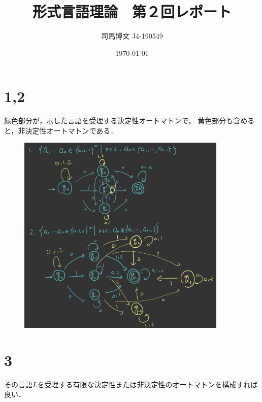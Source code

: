 \documentclass[uplatex, dvipdfmx]{jsarticle}
\title{形式言語理論　第２回レポート}
\author{司馬博文 J4-190549}
\date{\today}
\begin{document}
\maketitle

\section*{1,2}

緑色部分が，示した言語を受理する決定性オートマトンで，
黄色部分も含めると，非決定性オートマトンである．

\begin{center}\begin{figure}[h]\centering
    \includegraphics[width=10cm]{形式言語理論.jpg}
\end{figure}\end{center}

\section*{3}

その言語$L$を受理する有限な決定性または非決定性のオートマトンを構成すれば良い．
\end{document}
